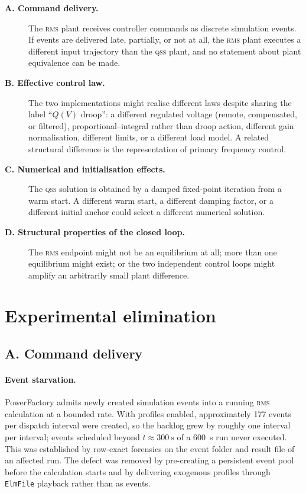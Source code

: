 \documentclass[11pt,a4paper]{article}
\newcommand{\qss}{\textsc{qss}}
\newcommand{\rms}{\textsc{rms}}
\begin{document}
\begin{description}
  \item[\textbf{A. Command delivery.}] The \rms{} plant receives controller
        commands as discrete simulation events. If events are delivered
        late, partially, or not at all, the \rms{} plant executes a
        different input trajectory than the \qss{} plant, and no statement
        about plant equivalence can be made.
  \item[\textbf{B. Effective control law.}] The two implementations might
        realise different laws despite sharing the label ``$Q(V)$
        droop'': a different regulated voltage (remote, compensated, or
        filtered), proportional--integral rather than droop action,
        different gain normalisation, different limits, or a different load
        model. A related structural difference is the representation of
        primary frequency control.
  \item[\textbf{C. Numerical and initialisation effects.}] The \qss{}
        solution is obtained by a damped fixed-point iteration from a
        warm start. A different warm start, a different damping factor, or a
        different initial anchor could select a different numerical
        solution.
  \item[\textbf{D. Structural properties of the closed loop.}] The \rms{}
        endpoint might not be an equilibrium at all; more than one
        equilibrium might exist; or the two independent control loops might
        amplify an arbitrarily small plant difference.
\end{description}

\section{Experimental elimination}

\subsection{A. Command delivery}

\paragraph{Event starvation.} PowerFactory admits newly created simulation
events into a running \rms{} calculation at a bounded rate. With profiles
enabled, approximately 177 events per dispatch interval were created, so the
backlog grew by roughly one interval per interval; events scheduled beyond
$t\approx\SI{300}{\second}$ of a \SI{600}{\second} run never executed. This
was established by row-exact forensics on the event folder and result file
of an affected run. The defect was removed by pre-creating a persistent event
pool before the calculation starts and by delivering exogenous profiles
through \texttt{ElmFile} playback rather than as events.
\end{document}
